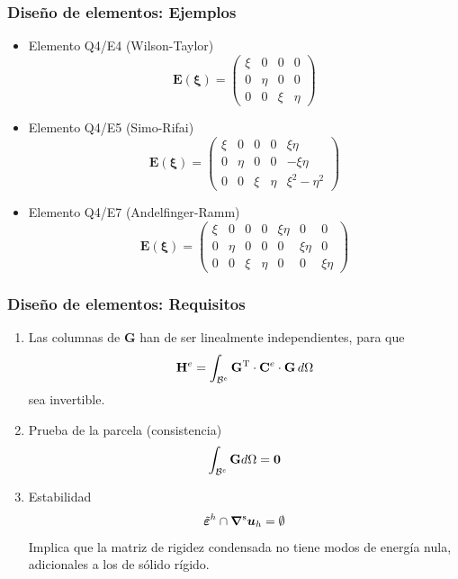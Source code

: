 \documentclass[handout]{beamer}
\begin{document}
\begin{frame}
\frametitle{Diseño de elementos: Ejemplos}
\begin{footnotesize}
\begin{itemize}
\item Elemento Q4/E4 (Wilson-Taylor)
$$
{\bm E}({\bm \xi})=
\left(
\begin{array}{cccc}
\xi&0&0&0 \\
0  &\eta&0&0\\
0  &   0&\xi&\eta
\end{array}
\right)
$$
\item Elemento Q4/E5 (Simo-Rifai)
$$
{\bm E}({\bm \xi})=
\left(
\begin{array}{ccccc}
\xi&0&0&0&\xi \eta \\
0  &\eta&0&0&-\xi \eta \\
0  &   0&\xi&\eta&\xi^2-\eta^2
\end{array}
\right)
$$
\item Elemento Q4/E7 (Andelfinger-Ramm)
$$
{\bm E}({\bm \xi})=
\left(
\begin{array}{ccccccc}
\xi&0&0&0&\xi \eta&0&0 \\
0  &\eta&0&0&0&\xi \eta&0\\
0  &   0&\xi&\eta&0&0&\xi \eta
\end{array}
\right)
$$
\end{itemize}
\end{footnotesize}
\end{frame}
\begin{frame}
\frametitle{Diseño de elementos: Requisitos}
\begin{enumerate}
\item Las columnas de $\bm{G}$ han de ser linealmente independientes, para
que
$$
{\bf H}^{e}=
\int_{{\cal B}^{e}}
   {\bf G}^{\rm T} \cdot {\bf C}^{e} \cdot {\bf G} \, d \Omega
$$
sea invertible.
\item Prueba de la parcela (consistencia)
$$
\int_{{\cal B}^{e}}
   {\bf G} d \Omega=\bm{0}
$$
\item Estabilidad
$$\tilde{\bm{\varepsilon}}^h \cap \bm{\nabla}^{\rm s} \bm{u}_{h}=
\emptyset$$
Implica que la matriz de rigidez condensada no tiene modos de energía
nula, adicionales a los de sólido rígido.
\end{enumerate}
\end{frame}
\end{document}
